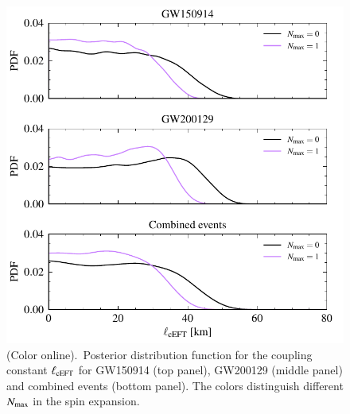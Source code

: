 \documentclass[twocolumn,
               prd,
               aps,
               superscriptaddress,
               tightenlines,
               nofootinbib,
               eqsecnum,
               amsfonts,
               amsmath,
               longbibliography]{revtex4-1}
\begin{document}
\begin{figure}[t]
\includegraphics[width=\columnwidth]{figs/ceft_posteriors_combined.pdf}
\caption{(Color online).~Posterior distribution function for the coupling constant $\ell_{\rm cEFT}$ for
GW150914 (top panel), GW200129 (middle panel) and combined events (bottom panel).
%
The colors distinguish different $N_{\rm max}$ in the spin expansion.
}
\label{fig:cEFT_exec_sum}
\end{figure}
\end{document}
